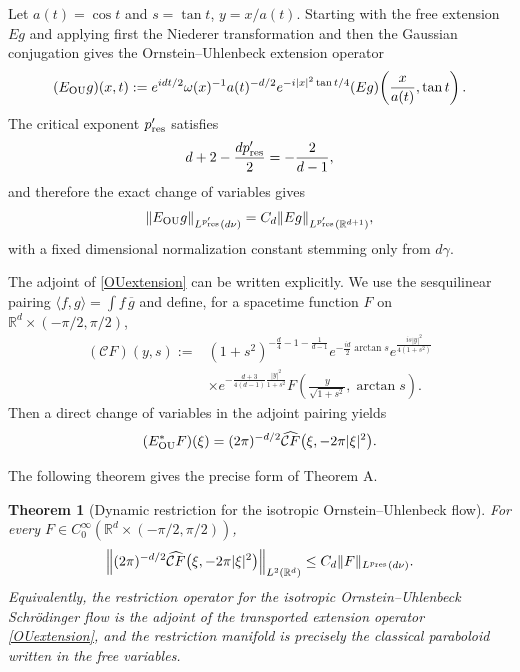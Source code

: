 \documentclass[11pt,a4paper]{amsart}
\numberwithin{equation}{section}
\newtheorem{theorem}{Theorem}[section]
\numberwithin{equation}{section}
\begin{document}
Let $a(t)=\cos t$ and $s=\tan t$, $y=x/a(t)$.  Starting with the free extension $Eg$ and applying first the Niederer transformation and then the Gaussian conjugation gives the Ornstein--Uhlenbeck extension operator
\begin{equation}
 (E_{\rm OU}g)(x,t)
 :=e^{idt/2}\omega(x)^{-1}a(t)^{-d/2}
 e^{-i|x|^2\tan t/4}
 (Eg)\!\left(\frac{x}{a(t)},\tan t\right).
 \label{OUextension}
\end{equation}
The critical exponent $p_{\rm res}'$ satisfies
\[
 d+2-\frac{d p_{\rm res}'}2=-\frac{2}{d-1},
\]
and therefore the exact change of variables gives
\begin{equation}
 \|E_{\rm OU}g\|_{L^{p_{\rm res}'}(d\nu)}
 =C_d\|Eg\|_{L^{p_{\rm res}'}(\mathbb R^{d+1})},
 \label{OUextensionnorm}
\end{equation}
with a fixed dimensional normalization constant stemming only from $d\gamma$.

The adjoint of \eqref{OUextension} can be written explicitly.  We use the sesquilinear pairing $\langle f,g\rangle=\int f\,\overline{g}$ and define, for a spacetime function $F$ on $\mathbb R^d\times(-\pi/2,\pi/2)$,
\begin{equation}
\begin{aligned}
 (\mathcal C F)(y,s)
 :={}&(1+s^2)^{-\frac d4-1-\frac1{d-1}}
 e^{-\frac{id}{2}\arctan s}
 e^{\frac{i s|y|^2}{4(1+s^2)}}
 \\
 &\times
 e^{-\frac{d+3}{4(d-1)}\frac{|y|^2}{1+s^2}}
 F\!\left(\frac{y}{\sqrt{1+s^2}},\arctan s\right).
\end{aligned}
\label{OUrestrictiontransform}
\end{equation}
Then a direct change of variables in the adjoint pairing yields
\begin{equation}
 (E_{\rm OU}^*F)(\xi)
 =(2\pi)^{-d/2}
 \widehat{\mathcal C F}\bigl(\xi,-2\pi|\xi|^2\bigr).
 \label{OUrestrictionoperator}
\end{equation}

The following theorem gives the precise form of Theorem A.

\begin{theorem}[Dynamic restriction for the isotropic Ornstein--Uhlenbeck flow]
\label{T:OUrestriction}
For every $F\in C_0^\infty(\mathbb R^d\times(-\pi/2,\pi/2))$,
\begin{equation}
 \left\|
 (2\pi)^{-d/2}
 \widehat{\mathcal C F}\bigl(\xi,-2\pi|\xi|^2\bigr)
 \right\|_{L^2(\mathbb R^d)}
 \le C_d
 \|F\|_{L^{p_{\rm res}}(d\nu)}.
 \label{OUrestriction}
\end{equation}
Equivalently, the restriction operator for the isotropic Ornstein--Uhlenbeck Schr\"odinger flow is the adjoint of the transported extension operator \eqref{OUextension}, and the restriction manifold is precisely the classical paraboloid written in the free variables.
\end{theorem}
\end{document}
